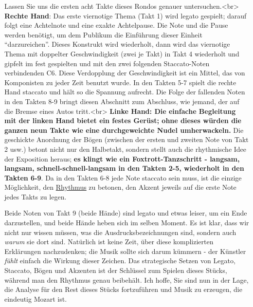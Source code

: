 Lassen Sie uns die ersten acht Takte dieses Rondos genauer untersuchen.<br>
\textbf{Rechte Hand}: Das erste viernotige Thema (Takt 1) wird legato gespielt; darauf folgt eine Achtelnote und eine exakte Achtelpause.
Die Note und die Pause werden benötigt, um dem Publikum die Einführung dieser Einheit \enquote{darzureichen}.
Dieses Konstrukt wird wiederholt, dann wird das viernotige Thema mit doppelter Geschwindigkeit (zwei je Takt) in Takt 4 wiederholt und gipfelt im fest gespielten und mit den zwei folgenden Staccato-Noten verbindenden C6.
Diese Verdopplung der Geschwindigkeit ist ein Mittel, das von Komponisten zu jeder Zeit benutzt wurde.
In den Takten 5-7 spielt die rechte Hand staccato und hält so die Spannung aufrecht.
Die Folge der fallenden Noten in den Takten 8-9 bringt diesen Abschnitt zum Abschluss, wie jemand, der auf die Bremse eines Autos tritt.<br>
\textbf{Linke Hand: Die einfache Begleitung mit der linken Hand bietet ein festes Gerüst; ohne dieses würden die ganzen neun Takte wie eine durchgeweichte Nudel umherwackeln.}
Die geschickte Anordnung der Bögen (zwischen der ersten und zweiten Note von Takt 2 usw.) betont nicht nur den Halbetakt, sondern stellt auch die rhythmische Idee der Exposition heraus; \textbf{es klingt wie ein Foxtrott-Tanzschritt - langsam, langsam, schnell-schnell-langsam in den Takten 2-5, wiederholt in den Takten 6-9}.
Da in den Takten 6-8 jede Note staccato sein muss, ist die einzige Möglichkeit, den \hyperref[c1iii1b]{Rhythmus} zu betonen, den Akzent jeweils auf die erste Note jedes Takts zu legen.

Beide Noten von Takt 9 (beide Hände) sind legato und etwas leiser, um ein Ende darzustellen, und beide Hände heben sich im selben Moment.
Es ist klar, dass wir nicht nur wissen müssen, was die Ausdrucksbezeichnungen sind, sondern auch \textit{warum} sie dort sind.
Natürlich ist keine Zeit, über diese komplizierten Erklärungen nachzudenken; die Musik sollte sich darum kümmern - der Künstler \textit{fühlt} einfach die Wirkung dieser Zeichen.
Das strategische Setzen von Legato, Staccato, Bögen und Akzenten ist der Schlüssel zum Spielen dieses Stücks, während man den Rhythmus genau beibehält.
Ich hoffe, Sie sind nun in der Lage, die Analyse für den Rest dieses Stücks fortzuführen und Musik zu erzeugen, die eindeutig Mozart ist.

